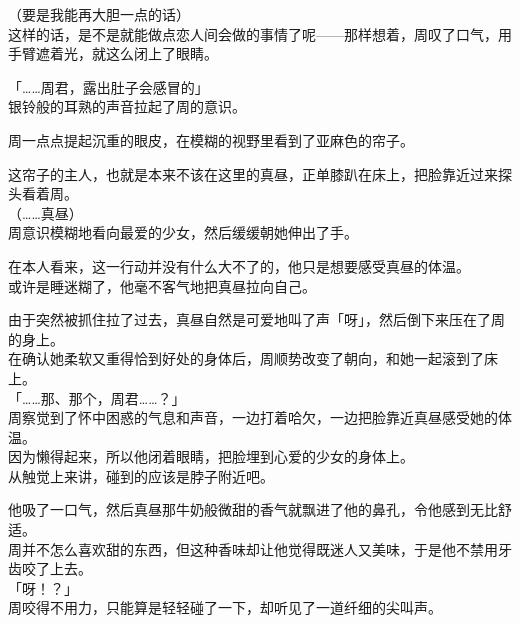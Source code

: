（要是我能再大胆一点的话）\\

这样的话，是不是就能做点恋人间会做的事情了呢——那样想着，周叹了口气，用手臂遮着光，就这么闭上了眼睛。\\

\vspace{2\baselineskip}

「……周君，露出肚子会感冒的」\\

银铃般的耳熟的声音拉起了周的意识。

周一点点提起沉重的眼皮，在模糊的视野里看到了亚麻色的帘子。

这帘子的主人，也就是本来不该在这里的真昼，正单膝趴在床上，把脸靠近过来探头看着周。\\

（……真昼）\\

周意识模糊地看向最爱的少女，然后缓缓朝她伸出了手。

在本人看来，这一行动并没有什么大不了的，他只是想要感受真昼的体温。\\

或许是睡迷糊了，他毫不客气地把真昼拉向自己。

由于突然被抓住拉了过去，真昼自然是可爱地叫了声「呀」，然后倒下来压在了周的身上。\\

在确认她柔软又重得恰到好处的身体后，周顺势改变了朝向，和她一起滚到了床上。\\

「……那、那个，周君……？」\\

周察觉到了怀中困惑的气息和声音，一边打着哈欠，一边把脸靠近真昼感受她的体温。\\

因为懒得起来，所以他闭着眼睛，把脸埋到心爱的少女的身体上。\\

从触觉上来讲，碰到的应该是脖子附近吧。

他吸了一口气，然后真昼那牛奶般微甜的香气就飘进了他的鼻孔，令他感到无比舒适。\\

周并不怎么喜欢甜的东西，但这种香味却让他觉得既迷人又美味，于是他不禁用牙齿咬了上去。\\

「呀！？」\\

周咬得不用力，只能算是轻轻碰了一下，却听见了一道纤细的尖叫声。

